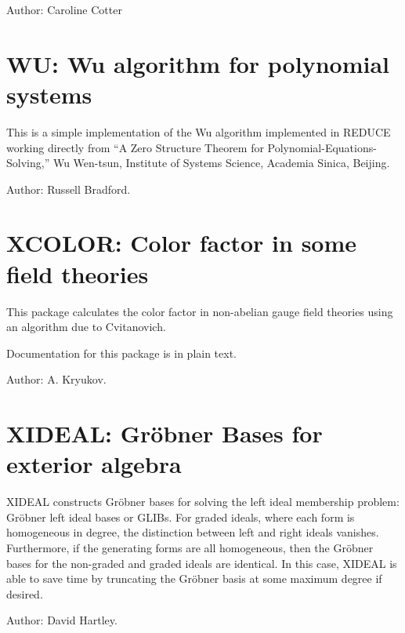 Author: Caroline Cotter



\newpage

\section{WU: Wu algorithm for polynomial systems} 

This is a simple implementation of the Wu algorithm implemented in REDUCE
working directly from ``A Zero Structure Theorem for
Polynomial-Equations-Solving,'' Wu Wen-tsun, Institute of Systems Science,
Academia Sinica, Beijing.

Author: Russell Bradford.


\newpage

\section{XCOLOR: Color factor in some field theories}


This package calculates the color factor in non-abelian gauge field
theories using an algorithm due to Cvitanovich.

Documentation for this package is in plain text.

Author: A. Kryukov.


\newpage

\section{XIDEAL: Gr\"obner Bases for exterior algebra} 

XIDEAL constructs Gr\"obner bases for solving the left ideal membership
problem: Gr\"obner left ideal bases or GLIBs. For graded ideals, where each
form is homogeneous in degree, the distinction between left and right
ideals vanishes. Furthermore, if the generating forms are all homogeneous,
then the Gr\"obner bases for the non-graded and graded ideals are
identical. In this case, XIDEAL is able to save time by truncating the
Gr\"obner basis at some maximum degree if desired.

Author: David Hartley.


\newpage

